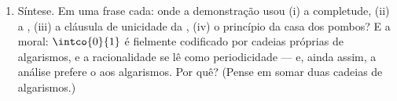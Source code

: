 \begin{problem}
\begin{enumerate}
        exatamente $0.3$ num computador.
  \item Síntese. Em uma frase cada: onde a demonstração usou
        (i) a completude, (ii) a , (iii)
        a cláusula de unicidade da , (iv) o princípio
        da casa dos pombos? E a moral: $\intco{0}{1}$ é fielmente
        codificado por cadeias próprias de algarismos, e a racionalidade
        se lê como periodicidade --- e, ainda assim, a análise prefere o
         aos algarismos. Por quê? (Pense em somar duas cadeias de
        algarismos.)
\end{enumerate}
\end{problem}
